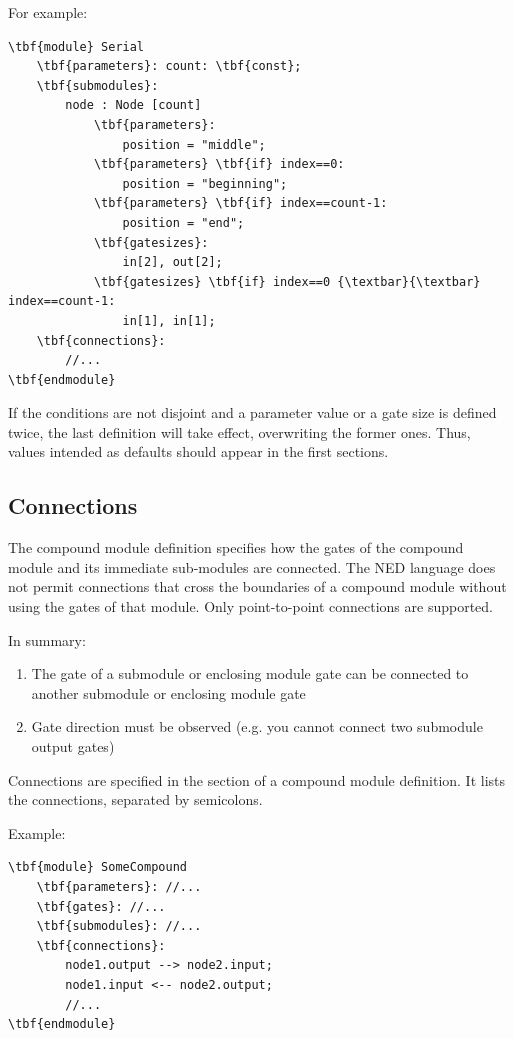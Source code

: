 For example:

\begin{Verbatim}[commandchars=\\\{\}]
\tbf{module} Serial
    \tbf{parameters}: count: \tbf{const};
    \tbf{submodules}:
        node : Node [count]
            \tbf{parameters}:
                position = "middle";
            \tbf{parameters} \tbf{if} index==0:
                position = "beginning";
            \tbf{parameters} \tbf{if} index==count-1:
                position = "end";
            \tbf{gatesizes}:
                in[2], out[2];
            \tbf{gatesizes} \tbf{if} index==0 {\textbar}{\textbar} index==count-1:
                in[1], in[1];
    \tbf{connections}:
        //...
\tbf{endmodule}
\end{Verbatim}


If the conditions are not disjoint and a parameter value or a
gate size is defined twice, the last definition will take effect,
overwriting the former ones. Thus, values intended as defaults
should appear in the first sections.





\subsection{Connections}


The compound module definition specifies how the gates of the compound
module and its immediate sub-modules are connected.
The NED language does not permit connections that cross the boundaries
of a compound module without using the gates of that module.
Only point-to-point connections are supported.


In summary:
\begin{enumerate}
  \item{The gate of a submodule or enclosing module gate can be connected
    to another submodule or enclosing module gate}
  \item{Gate direction must be observed (e.g. you cannot connect two
    submodule output gates)}
\end{enumerate}


Connections are specified in the
 section of a compound
module definition. It lists the connections, separated by semicolons.

Example:


\begin{Verbatim}[commandchars=\\\{\}]
\tbf{module} SomeCompound
    \tbf{parameters}: //...
    \tbf{gates}: //...
    \tbf{submodules}: //...
    \tbf{connections}:
        node1.output --> node2.input;
        node1.input <-- node2.output;
        //...
\tbf{endmodule}
\end{Verbatim}



